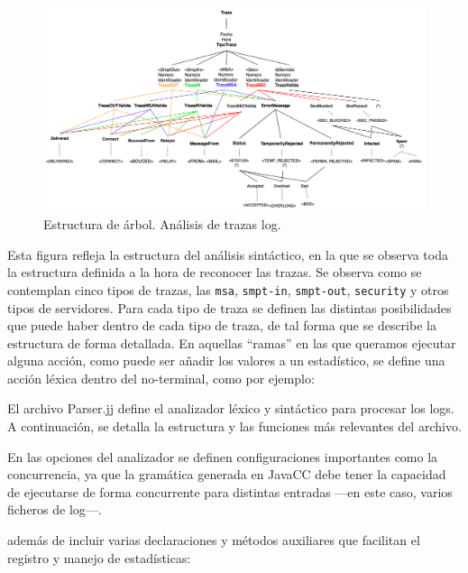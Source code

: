 \begin{figure}[H]
    \centering
    \includegraphics[width=\textwidth]{imagenes/arboltraza.png}
    \caption{Estructura de árbol. Análisis de trazas log.}
    \label{fig:arboltraza}
\end{figure}

Esta figura refleja la estructura del análisis sintáctico, en la que se observa toda la estructura definida a la hora de reconocer las trazas. Se observa como se contemplan cinco tipos de trazas, las \lstinline|msa|, \lstinline|smpt-in|, \lstinline|smpt-out|, \lstinline|security| y otros tipos de servidores. Para cada tipo de traza se definen las distintas posibilidades que puede haber dentro de cada tipo de traza, de tal forma que se describe la estructura de forma detallada. En aquellas ``ramas'' en las que queramos ejecutar alguna acción, como puede ser añadir los valores a un estadístico, se define una acción léxica dentro del no-terminal, como por ejemplo:

\lstset{inputencoding=utf8/latin1}


El archivo Parser.jj define el analizador léxico y sintáctico para procesar los logs. A continuación, se detalla la estructura y las funciones más relevantes del archivo.

En las opciones del analizador se definen configuraciones importantes como la concurrencia, ya que la gramática generada en JavaCC debe tener la capacidad de ejecutarse de forma concurrente para distintas entradas ---en este caso, varios ficheros de log---.

\lstset{inputencoding=utf8/latin1}


además de incluir varias declaraciones y métodos auxiliares que facilitan el registro y manejo de estadísticas:

